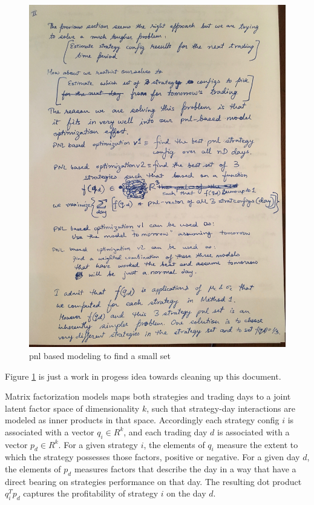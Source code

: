 \documentclass[a4paper]{article}
\begin{document}
\begin{centering}
	\begin{figure}
		
		\includegraphics[scale=0.05]{pnl_based_modeling_to_find_a_small_set.jpg}
		
		\caption{pnl based modeling to find a small set}
		\label{fig:pnl based modeling to find a small set}
		
	\end{figure}
\end{centering}

Figure
\ref{fig:pnl based modeling to find a small set}
is just a work in progess idea towards cleaning up this document.

Matrix factorization models maps both strategies and trading days
to a joint latent factor space of dimensionality $k$, such that
strategy-day interactions are modeled as inner products in
that space. Accordingly each strategy config $i$ is associated with a
vector $q_i \in R^k$, and each trading day $d$ is associated with a
vector $p_{d} \in R^k$. For a given strategy $i$, the elements of
$q_i$ measure the extent to which the strategy possesses those
factors, positive or negative. For a given day $d$, the elements of
$p_{d}$ measures factors that describe the day in a way that have a
direct bearing on strategies performance on that day. The resulting
dot product $q_i^T p_{d}$ captures the profitability of strategy $i$
on the day $d$.
\end{document}

